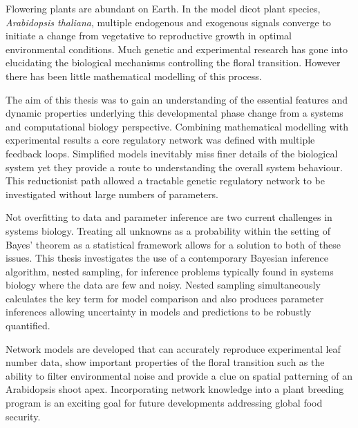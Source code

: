 Flowering plants are abundant on Earth.
In the model dicot plant species, \emph{Arabidopsis thaliana}, multiple endogenous and exogenous signals converge to initiate a change from vegetative to reproductive growth in optimal environmental conditions.
Much genetic and experimental research has gone into elucidating the biological mechanisms controlling the floral transition.
However there has been little mathematical modelling of this process.

The aim of this thesis was to gain an understanding of the essential features and dynamic properties underlying this developmental phase change from a systems and computational biology perspective.
Combining mathematical modelling with experimental results a core regulatory network was defined with multiple feedback loops.
Simplified models inevitably miss finer details of the biological system yet they provide a route to understanding the overall system behaviour.
This reductionist path allowed a tractable genetic regulatory network to be investigated without large numbers of parameters.

Not overfitting to data and parameter inference are two current challenges in systems biology.
Treating all unknowns as a probability within the setting of Bayes' theorem as a statistical framework allows for a solution to both of these issues.
This thesis investigates the use of a contemporary Bayesian inference algorithm, nested sampling, for inference problems typically found in systems biology where the data are few and noisy.
Nested sampling simultaneously calculates the key term for model comparison and also produces parameter inferences allowing uncertainty in models and predictions to be robustly quantified.

Network models are developed that can accurately reproduce experimental leaf number data, show important properties of the floral transition such as the ability to filter environmental noise and provide a clue on spatial patterning of an Arabidopsis shoot apex.
Incorporating network knowledge into a plant breeding program is an exciting goal for future developments addressing global food security.